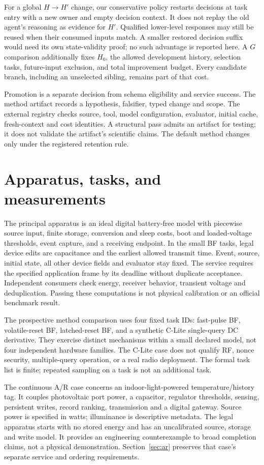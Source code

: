 For a global $H\rightarrow H'$ change, our conservative policy restarts decisions
at task entry with a new owner and empty decision context. It does not replay
the old agent's reasoning as evidence for $H'$. Qualified lower-level responses
may still be reused when their consumed inputs match. A smaller restored decision
suffix would need its own state-validity proof; no such advantage is reported
here. A $G$ comparison additionally fixes $H_0$, the allowed development history,
selection tasks, future-input exclusion, and total improvement budget. Every
candidate branch, including an unselected sibling, remains part of that cost.

Promotion is a separate decision from schema eligibility and service success.
The method artifact records a hypothesis, falsifier, typed change and scope.
The external registry checks source, tool, model configuration, evaluator,
initial cache, fresh-context and cost identities. A structural pass admits an
artifact for testing; it does not validate the artifact's scientific claims.
The default method changes only under the registered retention rule.

\section{Apparatus, tasks, and measurements}
The principal apparatus is an ideal digital battery-free model with piecewise
source input, finite storage, conversion and sleep costs, boot and loaded-voltage
thresholds, event capture, and a receiving endpoint. In the small BF tasks, legal
device edits are capacitance and the earliest allowed transmit time. Event,
source, initial state, all other device fields and evaluator stay fixed. The
service requires the specified application frame by its deadline without
duplicate acceptance. Independent consumers check energy, receiver behavior,
transient voltage and deduplication. Passing these computations is not physical
calibration or an official benchmark result.

The prospective method comparison uses four fixed task IDs: fast-pulse BF,
volatile-reset BF, latched-reset BF, and a synthetic C-Lite single-query DC
derivative. They exercise distinct mechanisms within a small declared model,
not four independent hardware families. The C-Lite case does not qualify RF,
nonce security, multiple-query operation, or a real radio deployment. The formal
task list is finite; repeated sampling on a task is not an additional task.

The continuous A/R case concerns an indoor-light-powered temperature/history tag.
It couples photovoltaic port power, a capacitor, regulator thresholds, sensing,
persistent writes, record ranking, transmission and a digital gateway. Source
power is specified in watts; illuminance is descriptive metadata. The legal
apparatus starts with no stored energy and has an uncalibrated source, storage
and write model. It provides an engineering counterexample to broad completion
claims, not a physical demonstration. Section~\ref{sec:ar} preserves that case's
separate service and ordering requirements.

